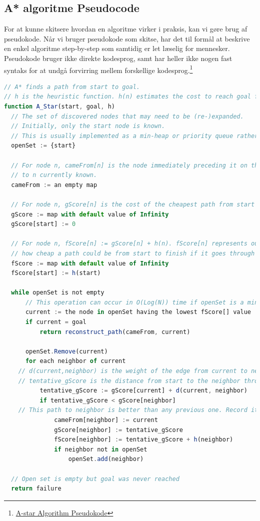 \documentclass[12pt]{article}
\begin{document}
\newpage

\subsection{A* algoritme Pseudocode}
For at kunne skitsere hvordan en algoritme virker i praksis, kan vi gøre brug af pseudokode. Når vi bruger pseudokode som skitse, har det til formål at beskrive en enkel algoritme step-by-step som samtidig er let læselig for mennesker. Pseudokode bruger ikke direkte kodesprog, samt har heller ikke nogen fast syntaks for at undgå forvirring mellem forskellige kodesprog.\footnote{\href{https://en.wikipedia.org/wiki/A*_search_algorithm}{A-star Algorithm Pseudokode}}
\begin{lstlisting}[language=JavaScript, caption=Dijkstra’s Algorithm Pseudocode oversat til Dansk]
// A* finds a path from start to goal.
// h is the heuristic function. h(n) estimates the cost to reach goal from node n.
function A_Star(start, goal, h)
  // The set of discovered nodes that may need to be (re-)expanded.
  // Initially, only the start node is known.
  // This is usually implemented as a min-heap or priority queue rather than a hash-set.
  openSet := {start}

  // For node n, cameFrom[n] is the node immediately preceding it on the cheapest path from start
  // to n currently known.
  cameFrom := an empty map

  // For node n, gScore[n] is the cost of the cheapest path from start to n currently known.
  gScore := map with default value of Infinity
  gScore[start] := 0

  // For node n, fScore[n] := gScore[n] + h(n). fScore[n] represents our current best guess as to
  // how cheap a path could be from start to finish if it goes through n.
  fScore := map with default value of Infinity
  fScore[start] := h(start)

  while openSet is not empty
      // This operation can occur in O(Log(N)) time if openSet is a min-heap or a priority queue
      current := the node in openSet having the lowest fScore[] value
      if current = goal
          return reconstruct_path(cameFrom, current)

      openSet.Remove(current)
      for each neighbor of current
    // d(current,neighbor) is the weight of the edge from current to neighbor
    // tentative_gScore is the distance from start to the neighbor through current
          tentative_gScore := gScore[current] + d(current, neighbor)
          if tentative_gScore < gScore[neighbor]
    // This path to neighbor is better than any previous one. Record it!
              cameFrom[neighbor] := current
              gScore[neighbor] := tentative_gScore
              fScore[neighbor] := tentative_gScore + h(neighbor)
              if neighbor not in openSet
                  openSet.add(neighbor)

  // Open set is empty but goal was never reached
  return failure
\end{lstlisting}
\end{document}
